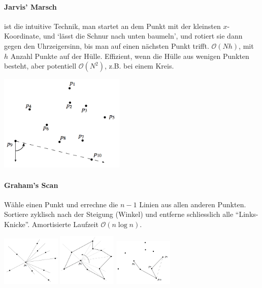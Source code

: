 \documentclass[a4paper, 9pt, DIV=20]{scrartcl}
\newcommand{\Oh}{\mathcal{O}}
\begin{document}
\paragraph{Jarvis' Marsch} ist die intuitive Technik, man startet an dem Punkt mit der kleinsten $x$-Koordinate, und `lässt die Schnur nach unten baumeln', und rotiert sie dann gegen den Uhrzeigersinn, bis man auf einen nächsten Punkt trifft. $\Oh(Nh)$, mit $h$ Anzahl Punkte auf der Hülle. Effizient, wenn die Hülle aus wenigen Punkten besteht, aber potentiell $\Oh(N^{2})$, z.B. bei einem Kreis.

\begin{center}
\includegraphics[width=6cm]{JarvisMarch}
\end{center}

\paragraph{Graham's Scan}
Wähle einen Punkt und errechne die $n-1$ Linien aus allen anderen Punkten. Sortiere zyklisch nach der Steigung (Winkel) und entferne schliesslich alle ``Links-Knicke''. Amortisierte Laufzeit $\Oh(n\log{n})$.
\begin{center}
\includegraphics[width=2.8cm]{GrahamScan1}
\includegraphics[width=2.8cm]{GrahamScan2}
\includegraphics[width=2.8cm]{GrahamScan3}
\end{center}
\end{document}
